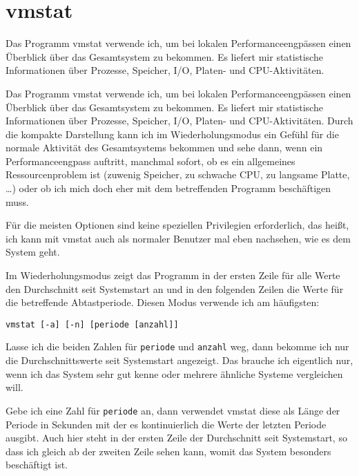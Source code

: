 \section{vmstat}
\label{sec:lokal-werkzeuge-vmstat}

\begin{abstractsec}
  Das Programm vmstat verwende ich, um bei lokalen Performanceengpässen einen
  Überblick über das Gesamtsystem zu bekommen. Es liefert mir statistische
  Informationen über Prozesse, Speicher, I/O, Platen- und CPU-Aktivitäten.
\end{abstractsec}
\begin{normaltext}
  Das Programm vmstat verwende ich, um bei lokalen Performanceengpässen einen
  Überblick über das Gesamtsystem zu bekommen. Es liefert mir statistische
  Informationen über Prozesse, Speicher, I/O, Platen- und CPU-Aktivitäten.
  Durch die kompakte Darstellung kann ich im Wiederholungsmodus  ein Gefühl
  für die normale Aktivität des Gesamtsystems bekommen und sehe dann, wenn ein
  Performanceengpass auftritt, manchmal sofort, ob es ein allgemeines
  Ressourcenproblem ist (zuwenig Speicher, zu schwache CPU, zu langsame
  Platte, \ldots) oder ob ich mich doch eher mit dem betreffenden Programm
  beschäftigen muss.

  Für die meisten Optionen sind keine speziellen Privilegien erforderlich, das
  heißt, ich kann mit vmstat auch als normaler Benutzer mal eben nachsehen,
  wie es dem System geht.
  
  Im Wiederholungsmodus zeigt das Programm in der ersten Zeile für alle Werte
  den Durchschnitt seit Systemstart an und in den folgenden Zeilen die Werte
  für die betreffende Abtastperiode. Diesen Modus verwende ich am häufigsten:
  \begin{verbatim}
vmstat [-a] [-n] [periode [anzahl]]
  \end{verbatim}
  Lasse ich die beiden Zahlen für \verb?periode? und \verb?anzahl? weg, dann
  bekomme ich nur die Durchschnittswerte seit Systemstart angezeigt. Das
  brauche ich eigentlich nur, wenn ich das System sehr gut kenne oder mehrere
  ähnliche Systeme vergleichen will.

  Gebe ich eine Zahl für \verb?periode? an, dann verwendet vmstat diese als Länge der
  Periode in Sekunden mit der es kontinuierlich die Werte der letzten Periode
  ausgibt. Auch hier steht in der ersten Zeile der Durchschnitt seit
  Systemstart, so dass ich gleich ab der zweiten Zeile sehen kann, womit das
  System besonders beschäftigt ist.


\end{normaltext}
